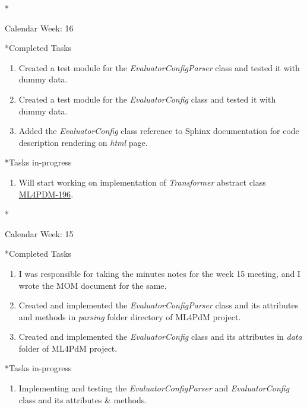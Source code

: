 \documentclass[11pt,a4paper]{article}
\begin{document}
\newpage
\begin{section}*{Calendar Week: 16 \hfill \date{23 April, 2021}}
 \begin{subsection}*{Completed Tasks}
     \begin{enumerate}
         \item Created a test module for the \textit{EvaluatorConfigParser} class and tested it with dummy data.
         \item Created a test module for the \textit{EvaluatorConfig} class and tested it with dummy data.
         \item Added the \textit{EvaluatorConfig} class reference to Sphinx documentation for code description rendering on \textit{html} page.
     \end{enumerate}
 \end{subsection}
 \begin{subsection}*{Tasks in-progress}
     \begin{enumerate}
         \item Will start working on implementation of \textit{Transformer} abstract class \href{https://ml4pdm.atlassian.net/browse/ML4PDM-196}{ML4PDM-196}.
     \end{enumerate}
 \end{subsection}
\end{section}

\newpage
\begin{section}*{Calendar Week: 15 \hfill \date{16 April, 2021}}
 \begin{subsection}*{Completed Tasks}
     \begin{enumerate}
         \item I was responsible for taking the minutes notes for the week 15 meeting, and I wrote the MOM document for the same.
         \item Created and implemented the \textit{EvaluatorConfigParser} class and its attributes and methods in \textit{parsing} folder directory of ML4PdM project.
         \item Created and implemented the \textit{EvaluatorConfig} class and its attributes in \textit{data} folder of ML4PdM project.
     \end{enumerate}
 \end{subsection}
 \begin{subsection}*{Tasks in-progress}
     \begin{enumerate}
         \item Implementing and testing the \textit{EvaluatorConfigParser} and \textit{EvaluatorConfig} class and its attributes \& methods.
     \end{enumerate}
 \end{subsection}
\end{section}
\end{document}
